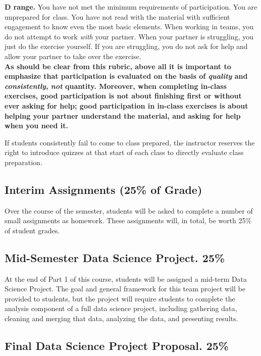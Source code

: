 \documentclass[12pt]{article}
\begin{document}
\textbf{D range.}  You have not met the minimum requirements of participation.  You are unprepared for class.  You have not read with the material with sufficient engagement to know even the most basic elements.  When working in teams, you do not attempt to work \emph{with} your partner. When your partner is struggling, you just do the exercise yourself. If you are struggling, you do not ask for help and allow your partner to take over the exercise.\\

\textbf{As should be clear from this rubric, above all it is important to emphasize that participation is evaluated on the basis of \emph{quality} and \emph{consistently}, \emph{not} quantity. Moreover, when completing in-class exercises, good participation is not about finishing first or without ever asking for help; good participation in in-class exercises is about helping your partner understand the material, and asking for help when you need it.}

If students consistently fail to come to class prepared, the instructor reserves the right to introduce quizzes at that start of each class to directly evaluate class preparation.

\subsection{Interim Assignments (25\% of Grade)}

Over the course of the semester, students will be asked to complete a number of small assignments as homework. These assignments will, in total, be worth 25\% of student grades.

\subsection{Mid-Semester Data Science Project.  25\%}

At the end of Part 1 of this course, students will be assigned a mid-term Data Science Project. The goal and general framework for this team project will be provided to students, but the project will require students to complete the analysis component of a full data science project, including gathering data, cleaning and merging that data, analyzing the data, and presenting results.

\subsection{Final Data Science Project Proposal. 25\%}
\end{document}
